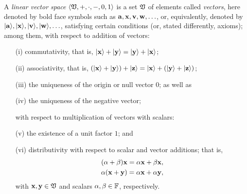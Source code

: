 A {\em linear vector space}      $\langle  \frak V , +, \cdot , -,  0, 1\rangle$
is a set $\frak V$ of elements called {\em vectors},
here denoted by  bold face  symbols such as
$
{\bf a},
{\bf x},
{\bf v},
{\bf w},
\ldots
$,
or, equivalently, denoted by
$
\vert {\bf a}\rangle,
\vert {\bf x}\rangle,
\vert {\bf v}\rangle,
\vert {\bf w}\rangle,
\ldots
$,
satisfying certain conditions (or, stated differently, axioms); among them,
with respect to addition of vectors:
\begin{itemize}
\item[(i)]
commutativity, that is, $\vert {\bf x}\rangle + \vert {\bf y}\rangle   = \vert {\bf y}\rangle + \vert {\bf x}\rangle$;
\item[(ii)]
associativity, that is, $(\vert {\bf x}\rangle + \vert {\bf y}\rangle ) +  \vert {\bf z}\rangle = \vert {\bf x}\rangle + (\vert {\bf y}\rangle +  \vert {\bf z}\rangle )$;
\item[(iii)]
the uniqueness of the origin or null vector $0$;
as well as
\item[(iv)]
the uniqueness of  the negative vector;
\item[ ]
with respect to multiplication of vectors with scalars:
\item[(v)]
the existence of a unit factor $1$; and
\item[(vi)]
distributivity with respect to scalar and vector additions; that is,
\begin{equation}
\begin{split}
(\alpha +\beta ){\bf x} = \alpha {\bf x}+\beta  {\bf x}, \\
\alpha ({\bf x} +{\bf y}) = \alpha {\bf x}+\alpha {\bf y},
\end{split}
\end{equation}
with ${\bf x}, {\bf y} \in \frak V$ and scalars $\alpha ,\beta \in  {\Bbb F}$,
respectively.
\end{itemize}

